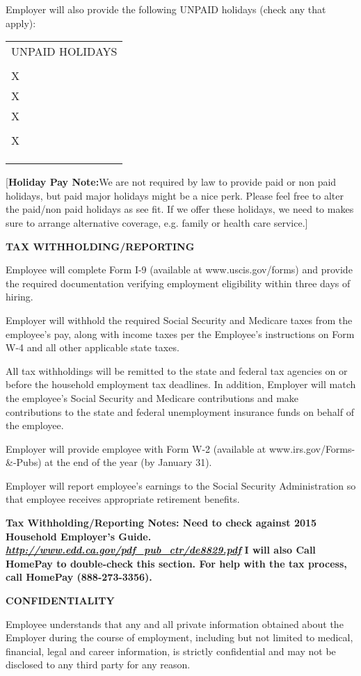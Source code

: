 \documentclass[]{article}
\newcommand{\toprule}{\hrulefill}
\newcommand{\bottomrule}{\hrulefill}
\begin{document}
Employer will also provide the following UNPAID holidays (check any that
apply):

\begin{tabular}[c]{@{}l@{}}
\toprule
UNPAID HOLIDAYS\tabularnewline
\tabularnewline
X\tabularnewline
X\tabularnewline
X\tabularnewline
\tabularnewline
X\tabularnewline
\tabularnewline
\tabularnewline
\bottomrule
\end{tabular}

{[}\textbf{Holiday Pay Note:}We are not required by law to provide paid
or non paid holidays, but paid major holidays might be a nice perk.
Please feel free to alter the paid/non paid holidays as see fit. If we
offer these holidays, we need to makes sure to arrange alternative
coverage, e.g. family or health care service.{]}

\textbf{TAX WITHHOLDING/REPORTING}

Employee will complete Form I-9 (available at www.uscis.gov/forms) and
provide the required documentation verifying employment eligibility
within three days of hiring.

Employer will withhold the required Social Security and Medicare taxes
from the employee's pay, along with income taxes per the Employee's
instructions on Form W-4 and all other applicable state taxes.

All tax withholdings will be remitted to the state and federal tax
agencies on or before the household employment tax deadlines. In
addition, Employer will match the employee's Social Security and
Medicare contributions and make contributions to the state and federal
unemployment insurance funds on behalf of the employee.

Employer will provide employee with Form W-2 (available at
www.irs.gov/Forms-\&-Pubs) at the end of the year (by January 31).

Employer will report employee's earnings to the Social Security
Administration so that employee receives appropriate retirement
benefits.

\textbf{Tax Withholding/Reporting Notes: Need to check against 2015
Household Employer's Guide.}
\href{http://www.edd.ca.gov/pdf_pub_ctr/de8829.pdf}{\textbf{\emph{http://www.edd.ca.gov/pdf\_pub\_ctr/de8829.pdf}}}
\textbf{I will also Call HomePay to double-check this section. For help
with the tax process, call HomePay (888-273-3356). }

\textbf{CONFIDENTIALITY}

Employee understands that any and all private information obtained about
the Employer during the course of employment, including but not limited
to medical, financial, legal and career information, is strictly
confidential and may not be disclosed to any third party for any reason.
\end{document}
